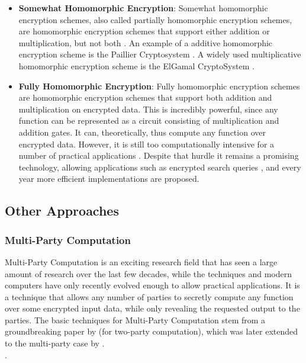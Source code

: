 \begin{itemize}
    \item \textbf{Somewhat Homomorphic Encryption}: Somewhat homomorphic encryption schemes, also called partially homomorphic encryption schemes, are homomorphic encryption schemes that support either addition or multiplication, but not both \citep{she}. An example of a additive homomorphic encryption scheme is the Paillier Cryptosystem \citep{paillier}. A widely used multiplicative homomorphic encryption scheme is the ElGamal CryptoSystem \citep{elgamal}.
    \item \textbf{Fully Homomorphic Encryption}: Fully homomorphic encryption schemes are homomorphic encryption schemes that support both addition and multiplication on encrypted data. This is incredibly powerful, since any function can be represented as a circuit consisting of multiplication and addition gates. It can, theoretically, thus compute any function over encrypted data. However, it is still too computationally intensive for a number of practical applications \citep{he-practical}. Despite that hurdle it remains a promising technology, allowing applications such as encrypted search queries \citep{fhe}, and every year more efficient implementations are proposed.
\end{itemize}
\subsection{Other Approaches}
\subsubsection{Multi-Party Computation}
\label{sec:mpc}
Multi-Party Computation is an exciting research field that has seen a large amount of research over the last few decades, while the techniques and modern computers have only recently evolved enough to allow practical applications. It is a technique that allows any number of parties to secretly compute any function over some encrypted input data, while only revealing the requested output to the parties. The basic techniques for Multi-Party Computation stem from a groundbreaking paper by \citet{yao} (for two-party computation), which was later extended to the multi-party case by \citet{mpc}.\\

.\\

